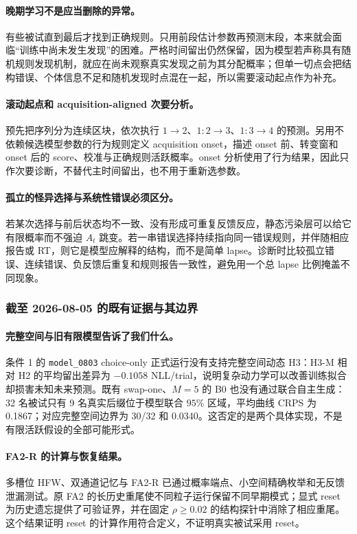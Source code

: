 \paragraph{晚期学习不是应当删除的异常。}
有些被试直到最后才找到正确规则。只用前段估计参数再预测末段，本来就会面临“训练中尚未发生发现”的困难。严格时间留出仍然保留，因为模型若声称具有随机规则发现机制，就应在尚未观察真实发现之前为其分配概率；但单一切点会把结构错误、个体信息不足和随机发现时点混在一起，所以需要滚动起点作为补充。

\paragraph{滚动起点和 acquisition-aligned 次要分析。}
预先把序列分为连续区块，依次执行 $1\rightarrow2$、$1{:}2\rightarrow3$、$1{:}3\rightarrow4$ 的预测。另用不依赖候选模型参数的行为规则定义 acquisition onset，描述 onset 前、转变窗和 onset 后的 score、校准与正确规则活跃概率。onset 分析使用了行为结果，因此只作次要诊断，不替代主时间留出，也不用于重新选参数。

\paragraph{孤立的怪异选择与系统性错误必须区分。}
若某次选择与前后状态均不一致、没有形成可重复反馈反应，静态污染层可以给它有限概率而不强迫 $A_t$ 跳变。若一串错误选择持续指向同一错误规则，并伴随相应报告或 RT，则它是模型应解释的结构，而不是简单 lapse。诊断时比较孤立错误、连续错误、负反馈后重复和规则报告一致性，避免用一个总 lapse 比例掩盖不同现象。


\subsubsection{截至 2026-08-05 的既有证据与其边界}

\paragraph{完整空间与旧有限模型告诉了我们什么。}
条件 1 的 \texttt{model\_0803} choice-only 正式运行没有支持完整空间动态 H3：H3-M 相对 H2 的平均留出差异为 $-0.1058$ NLL/trial，说明复杂动力学可以改善训练拟合却损害未知未来预测。既有 swap-one、$M=5$ 的 B0 也没有通过联合自主生成：32 名被试只有 9 名真实后缀位于模型联合 $95\%$ 区域，平均曲线 CRPS 为 0.1867；对应完整空间边界为 30/32 和 0.0340。这否定的是两个具体实现，不是有限活跃假设的全部可能形式。

\paragraph{FA2-R 的计算与恢复结果。}
多槽位 HFW、双通道记忆与 FA2-R 已通过概率端点、小空间精确枚举和无反馈泄漏测试。原 FA2 的长历史重尾使不同粒子运行保留不同早期模式；显式 reset 为历史遗忘提供了可验证界，并在固定 $\rho\geq0.02$ 的结构探针中消除了相应重尾。这个结果证明 reset 的计算作用符合定义，不证明真实被试采用 reset。


